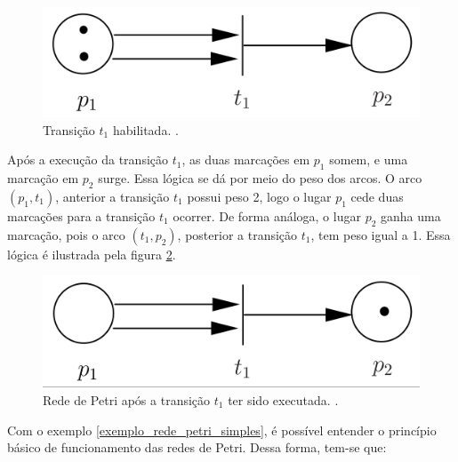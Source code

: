 \documentclass[
	12pt,				%
	openright,			%
	oneside,			%
	a4paper,			%
	english,			%
	brazil				%
	]{abntex2}
\begin{document}
\newpage

\begin{figure}[ht] 
	\centering
	\includegraphics[scale=0.3]{exemplo_simples_rede_petri_marcacao_p1.png}
	\caption[Rede de Petri Simples - Parte 2]{Transição $t_{1}$ habilitada. \textcite{CassandrasLafortune08}.}
	\label{fig:rede_petri_simples_ex_02}
\end{figure}

Após a execução da transição $t_{1}$, as duas marcações em $p_{1}$ somem, e uma marcação em $p_{2}$ surge. Essa lógica se dá por meio do peso dos arcos. O arco $(p_{1},t_{1})$, anterior a transição $t_{1}$ possui peso 2, logo o lugar $p_{1}$ cede duas marcações para a transição $t_{1}$ ocorrer. De forma análoga, o lugar $p_{2}$ ganha uma marcação, pois o arco $(t_{1},p_{2})$, posterior a transição $t_{1}$, tem peso igual a 1. Essa lógica é ilustrada pela figura \ref{fig:rede_petri_simples_ex_03}.

\begin{figure}[ht] 
	\centering
	\includegraphics[scale=0.3]{exemplo_simples_rede_petri_marcacao_p2.png}
	\caption[Rede de Petri Simples - Parte 3]{Rede de Petri após a transição $t_{1}$ ter sido executada. \textcite{CassandrasLafortune08}.}
	\label{fig:rede_petri_simples_ex_03}
\end{figure}

Com o exemplo \ref{exemplo_rede_petri_simples}, é possível entender o princípio básico de funcionamento das redes de Petri. Dessa forma, tem-se que:
\end{document}
